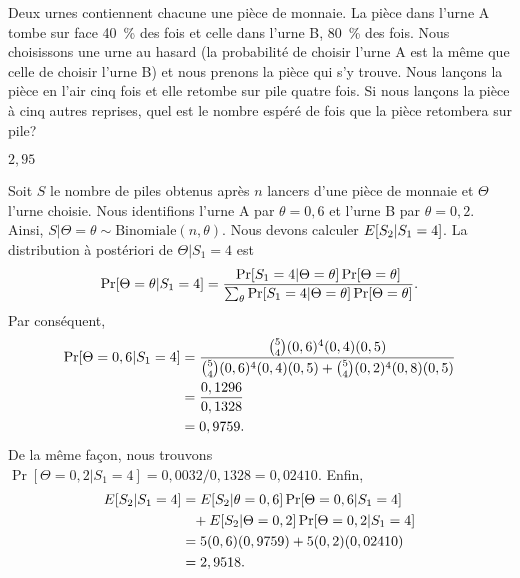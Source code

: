 \begin{exercice}
  Deux urnes contiennent chacune une pièce de monnaie. La pièce dans
  l'urne A tombe sur face 40~\% des fois et celle dans l'urne B, 80~\%
  des fois. Nous choisissons une urne au hasard (la probabilité de choisir
  l'urne A est la même que celle de choisir l'urne B) et nous prenons la
  pièce qui s'y trouve. Nous lançons la pièce en l'air cinq fois et elle
  retombe sur pile quatre fois. Si nous lançons la pièce à cinq autres
  reprises, quel est le nombre espéré de fois que la pièce retombera
  sur pile?
  \begin{rep}
    $2,95$
  \end{rep}
  \begin{sol}
    Soit $S$ le nombre de piles obtenus après $n$ lancers d'une pièce
    de monnaie et $\Theta$ l'urne choisie. Nous identifions l'urne A
    par $\theta = 0,6$ et l'urne B par $\theta = 0,2$. Ainsi,
    $S|\Theta = \theta \sim \text{Binomiale}(n, \theta)$. Nous devons
    calculer $E [ S_2|S_1 = 4 ]$. La distribution à
    postériori de $\Theta|S_1 = 4$ est
    \begin{equation*}
      \Pr[\Theta = \theta|S_1 = 4]
      = \frac{\Pr[S_1 = 4|\Theta = \theta] \Pr[\Theta = \theta]}{%
        \sum_\theta \Pr[S_1 = 4|\Theta = \theta] \Pr[\Theta = \theta]}.
    \end{equation*}
    Par conséquent,
    \begin{align*}
      \Pr[\Theta = 0,6|S_1 = 4]
      &= \frac{\binom{5}{4} (0,6)^4 (0,4) (0,5)}{%
        \binom{5}{4} (0,6)^4 (0,4) (0,5) +
        \binom{5}{4} (0,2)^4 (0,8) (0,5)} \\
      &= \frac{0,1296}{0,1328} \\
      &= 0,9759.
    \end{align*}
    De la même façon, nous trouvons $\Pr[\Theta = 0,2|S_1 = 4] =
    0,0032/0,1328 = 0,02410$. Enfin,
    \begin{align*}
      E [ S_2|S_1 = 4 ]
      &= E [ S_2|\theta = 0,6 ] \Pr[\Theta = 0,6|S_1 = 4] \\
      &\phantom{=}
      + E [ S_2|\Theta = 0,2 ] \Pr[\Theta = 0,2|S_1 = 4] \\
      &= 5 (0,6) (0,9759) + 5 (0,2) (0,02410) \\
      &= 2,9518.
    \end{align*}
  \end{sol}
\end{exercice}

